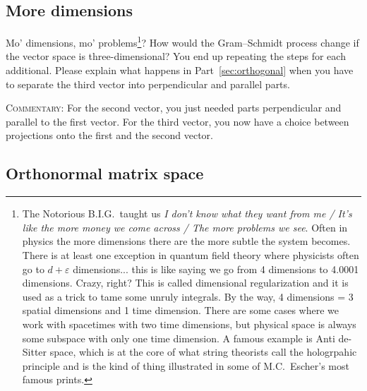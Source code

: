 \documentclass[12pt]{article}
\numberwithin{equation}{section}    %
\begin{document}
\subsection{More dimensions}
Mo' dimensions, mo' problems\footnote{The Notorious B.I.G.\ taught us \emph{I don't know what they want from me /
It's like the more money we come across /
The more problems we see}. Often in physics the more dimensions there are the more subtle the system becomes. There is at least one exception in quantum field theory where physicists often go to $d+\varepsilon$ dimensions... this is like saying we go from 4 dimensions to 4.0001 dimensions. Crazy, right? This is called dimensional regularization and it is used as a trick to tame some unruly integrals. By the way, 4 dimensions = 3 spatial dimensions and 1 time dimension. There are some cases where we work with spacetimes with two time dimensions, but physical space is always some subspace with only one time dimension. A famous example is Anti de-Sitter space, which is at the core of what string theorists call the hologrpahic principle and is the kind of thing illustrated in some of M.C.~Escher's most famous prints.}?
How would the Gram--Schmidt process change if the vector space is three-dimensional? You end up repeating the steps for each additional. Please explain what happens in Part~\ref{sec:orthogonal} when you have to separate the third vector into perpendicular and parallel parts. 

\textsc{Commentary:} For the second vector, you just needed parts perpendicular and parallel to the first vector. For the third vector, you now have a choice between projections onto the first and the second vector. 

\subsection{Orthonormal matrix space}
\end{document}
